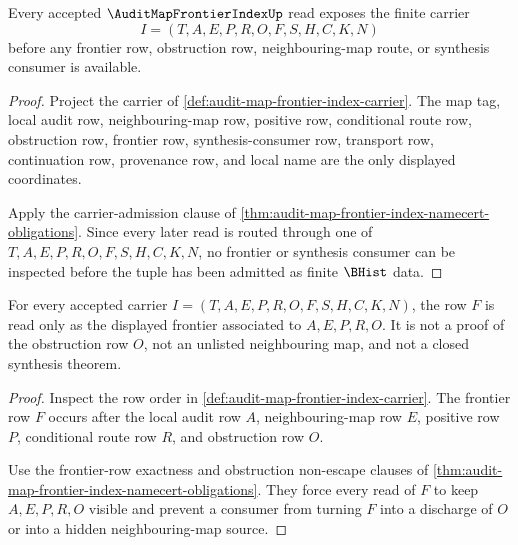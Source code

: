 \begin{theorem}
\label{thm:auditmapfrontierindex-carrier-obligation}
Every accepted $\AuditMapFrontierIndexUp$ read exposes the finite carrier
$$
I=(T,A,E,P,R,O,F,S,H,C,K,N)
$$
before any frontier row, obstruction row, neighbouring-map route, or synthesis consumer is available.
\end{theorem}
\begin{proof}
Project the carrier of \autoref{def:audit-map-frontier-index-carrier}. The map tag, local audit row, neighbouring-map row, positive row, conditional route row, obstruction row, frontier row, synthesis-consumer row, transport row, continuation row, provenance row, and local name are the only displayed coordinates.

Apply the carrier-admission clause of \autoref{thm:audit-map-frontier-index-namecert-obligations}. Since every later read is routed through one of $T,A,E,P,R,O,F,S,H,C,K,N$, no frontier or synthesis consumer can be inspected before the tuple has been admitted as finite $\BHist$ data.
\end{proof}

\begin{theorem}
\label{thm:auditmapfrontierindex-frontier-row-obligation}
For every accepted carrier $I=(T,A,E,P,R,O,F,S,H,C,K,N)$, the row $F$ is read only as the displayed frontier associated to $A,E,P,R,O$. It is not a proof of the obstruction row $O$, not an unlisted neighbouring map, and not a closed synthesis theorem.
\end{theorem}
\begin{proof}
Inspect the row order in \autoref{def:audit-map-frontier-index-carrier}. The frontier row $F$ occurs after the local audit row $A$, neighbouring-map row $E$, positive row $P$, conditional route row $R$, and obstruction row $O$.

Use the frontier-row exactness and obstruction non-escape clauses of \autoref{thm:audit-map-frontier-index-namecert-obligations}. They force every read of $F$ to keep $A,E,P,R,O$ visible and prevent a consumer from turning $F$ into a discharge of $O$ or into a hidden neighbouring-map source.
\end{proof}


